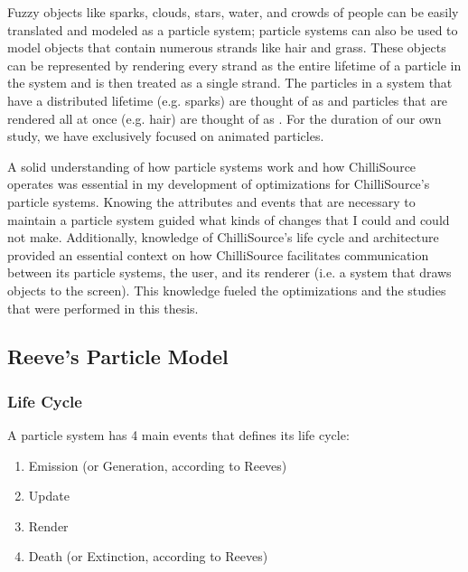 Fuzzy objects like sparks, clouds, stars, water, and crowds of people can be easily translated and modeled as a particle system; particle systems can also be used to model objects that contain numerous strands like hair and grass. These objects can be represented by rendering every strand as the entire lifetime of a particle in the system and is then treated as a single strand. The particles in a system that have a distributed lifetime (e.g. sparks) are thought of as  and particles that are rendered all at once (e.g. hair) are thought of as . For the duration of our own study, we have exclusively focused on animated particles.

A solid understanding of how particle systems work and how ChilliSource operates was essential in my development of optimizations for ChilliSource's particle systems. Knowing the attributes and events that are necessary to maintain a particle system guided what kinds of changes that I could and could not make. Additionally, knowledge of ChilliSource's life cycle and architecture provided an essential context on how ChilliSource facilitates communication between its particle systems, the user, and its renderer (i.e. a system that draws objects to the screen). This knowledge fueled the optimizations and the studies that were performed in this thesis.

\subsection{Reeve's Particle Model}\label{ssec:particle_systems_particle_model} 

\subsubsection{Life Cycle}

A particle system has 4 main events that defines its life cycle:

\begin{enumerate}
	\itemsep-1.0em
	\item Emission (or Generation, according to Reeves)
	\item Update
	\item Render
	\item Death (or Extinction, according to Reeves)
\end{enumerate}

